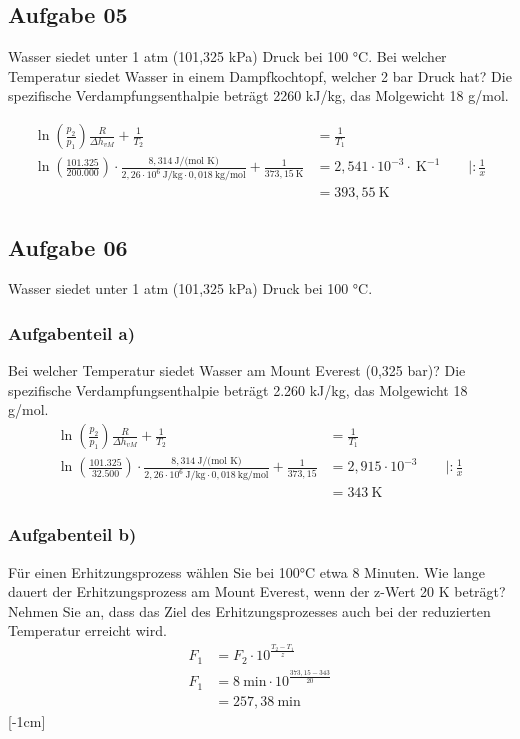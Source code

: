 \documentclass[a4paper,10pt]{article}
\begin{document}
\pagebreak
\subsection*{Aufgabe 05}
Wasser siedet unter 1 atm (101,325 kPa) Druck bei 100 °C. Bei welcher Temperatur siedet
Wasser in einem Dampfkochtopf, welcher 2 bar Druck hat? Die spezifische
Verdampfungsenthalpie beträgt 2260 kJ/kg, das Molgewicht 18 g/mol.

\begin{align*}
\ln(\frac{p_2}{p_1})\frac{R}{\Delta h_{vM}}+\frac{1}{T_2}&=\frac{1}{T_1} \\
\ln(\frac{101.325}{200.000}) \cdot \frac{8,314 ~\text{J/(mol K)}}{2,26 \cdot 10^6 ~\text{J/kg} \cdot 0,018 ~\text{kg/mol}}+\frac{1}{373,15 ~\text{K}}&=2,541 \cdot 10^{-3} \cdot ~\text{K}^{-1} \qquad | :\frac{1}{x} \\ 
&=393,55 ~\text{K}
\end{align*} 


\subsection*{Aufgabe 06}
Wasser siedet unter 1 atm (101,325 kPa) Druck bei 100 °C.
\subsubsection*{Aufgabenteil a)}
Bei welcher Temperatur siedet Wasser am Mount Everest (0,325 bar)? Die spezifische
Verdampfungsenthalpie beträgt 2.260 kJ/kg, das Molgewicht 18 g/mol.
\begin{align*}
\ln(\frac{p_2}{p_1})\frac{R}{\Delta h_{vM}}+\frac{1}{T_2}&=\frac{1}{T_1} \\
\ln(\frac{101.325}{32.500}) \cdot \frac{8,314 ~\text{J/(mol K)}}{2,26 \cdot 10^6 ~\text{J/kg} \cdot 0,018 ~\text{kg/mol}}+\frac{1}{373,15}&=2,915 \cdot 10^{-3} \qquad | :\frac{1}{x} \\ 
&=343 ~\text{K}
\end{align*} 
\subsubsection*{Aufgabenteil b)}
Für einen Erhitzungsprozess wählen Sie bei 100°C etwa 8 Minuten. Wie lange dauert der
Erhitzungsprozess am Mount Everest, wenn der z-Wert 20 K beträgt? Nehmen Sie an, dass
das Ziel des Erhitzungsprozesses auch bei der reduzierten Temperatur erreicht wird. 
\begin{align*}
F_1 &= F_2 \cdot 10^{\frac{T_2-T_1}{z}} \\
F_1 &= 8~\text{min} \cdot 10^{\frac{373,15-343}{20}} \\
 &= 257,38 ~\text{min}
\end{align*}
\reversemarginpar
{}[-1cm]
\end{document}
